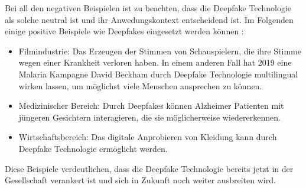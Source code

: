 Bei all den negativen Beispielen ist zu beachten, dass die Deepfake Technologie als solche neutral ist und ihr Anwedungskontext entscheidend ist. 
Im Folgenden einige positive Beispiele wie Deepfakes eingesetzt werden können \cite{westerlundEmergenceDeepfakeTechnology2019}:
\begin{itemize}
    \item Filmindustrie: Das Erzeugen der Stimmen von Schauspielern, die ihre Stimme wegen einer Krankheit verloren haben. 
        In einem anderen Fall hat 2019 eine Malaria Kampagne David Beckham durch Deepfake Technologie multilingual wirken lassen, um möglichst viele Menschen ansprechen zu können.
    \item Medizinischer Bereich: Durch Deepfakes können Alzheimer Patienten mit jüngeren Gesichtern interagieren, die sie möglicherweise wiedererkennen. 
    \item Wirtschaftsbereich: Das digitale Anprobieren von Kleidung kann durch Deepfake Technologie ermöglicht werden.
\end{itemize}
Diese Beispiele verdeutlichen, dass die Deepfake Technologie bereits jetzt in der Gesellschaft verankert ist und sich in Zukunft noch weiter ausbreiten wird.

